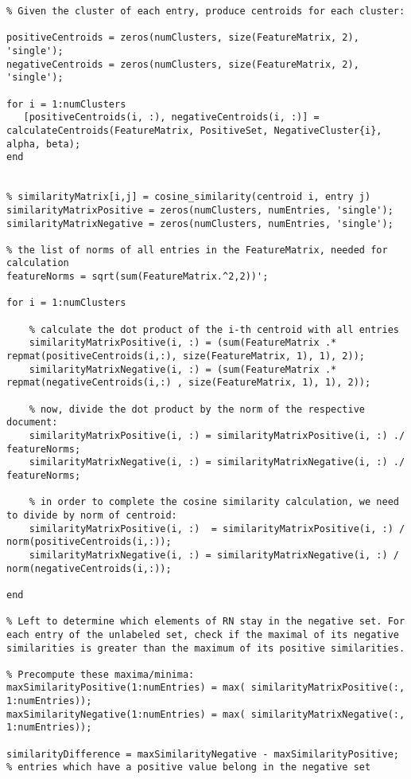 \documentclass[12pt,twoside,notitlepage,amsart]{report} %
\begin{document}
\begin{lstlisting}
% Given the cluster of each entry, produce centroids for each cluster:

positiveCentroids = zeros(numClusters, size(FeatureMatrix, 2), 'single');
negativeCentroids = zeros(numClusters, size(FeatureMatrix, 2), 'single');

for i = 1:numClusters 
   [positiveCentroids(i, :), negativeCentroids(i, :)] = calculateCentroids(FeatureMatrix, PositiveSet, NegativeCluster{i}, alpha, beta);
end


% similarityMatrix[i,j] = cosine_similarity(centroid i, entry j)
similarityMatrixPositive = zeros(numClusters, numEntries, 'single');
similarityMatrixNegative = zeros(numClusters, numEntries, 'single');

% the list of norms of all entries in the FeatureMatrix, needed for calculation
featureNorms = sqrt(sum(FeatureMatrix.^2,2))';

for i = 1:numClusters
    
    % calculate the dot product of the i-th centroid with all entries
    similarityMatrixPositive(i, :) = (sum(FeatureMatrix .* repmat(positiveCentroids(i,:), size(FeatureMatrix, 1), 1), 2));
    similarityMatrixNegative(i, :) = (sum(FeatureMatrix .* repmat(negativeCentroids(i,:) , size(FeatureMatrix, 1), 1), 2));

    % now, divide the dot product by the norm of the respective document:
    similarityMatrixPositive(i, :) = similarityMatrixPositive(i, :) ./  featureNorms;
    similarityMatrixNegative(i, :) = similarityMatrixNegative(i, :) ./ featureNorms;
    
    % in order to complete the cosine similarity calculation, we need to divide by norm of centroid:
    similarityMatrixPositive(i, :)  = similarityMatrixPositive(i, :) / norm(positiveCentroids(i,:));
    similarityMatrixNegative(i, :) = similarityMatrixNegative(i, :) / norm(negativeCentroids(i,:));

end

% Left to determine which elements of RN stay in the negative set. For each entry of the unlabeled set, check if the maximal of its negative similarities is greater than the maximum of its positive similarities.

% Precompute these maxima/minima:
maxSimilarityPositive(1:numEntries) = max( similarityMatrixPositive(:, 1:numEntries)); 
maxSimilarityNegative(1:numEntries) = max( similarityMatrixNegative(:, 1:numEntries));

similarityDifference = maxSimilarityNegative - maxSimilarityPositive;
% entries which have a positive value belong in the negative set


\end{lstlisting}
\end{document}
